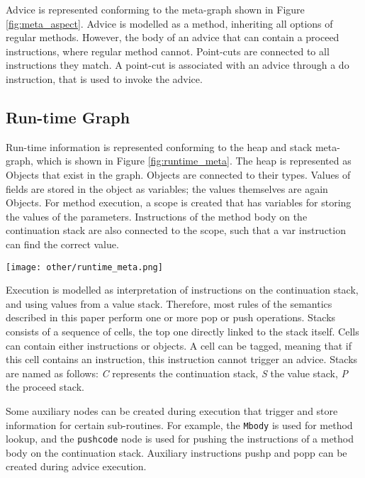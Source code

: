Advice is represented conforming to the meta-graph shown in Figure \ref{fig:meta_aspect}. Advice is modelled as a method, inheriting all options of regular methods. However, the body of an advice that can contain a {\sc proceed} instructions, where regular method cannot. Point-cuts are connected to all instructions they match. A point-cut is associated with an advice through a {\sc do} instruction, that is used to invoke the advice. 

\subsection{Run-time Graph}

Run-time information is represented conforming to the heap and stack
meta-graph, which is shown in Figure \ref{fig:runtime_meta}.  The heap is
represented as Objects that exist in the graph. Objects are connected to their
types. Values of fields are stored in the object as variables; the values
themselves are again Objects.  For method execution, a scope is created that
has variables for storing the values of the parameters. Instructions of the
method body on the continuation stack are also connected to the scope, such
that a {\sc var} instruction can find the correct value.

\begin{figure*}
	\begin{center}
		\texttt{[image: other/runtime\_meta.png]}
	\end{center}
		\caption{Meta-graph of run-time information.}
	\label{fig:runtime_meta}
\end{figure*}

Execution is modelled as interpretation of instructions on the continuation
stack, and using values from a value stack. Therefore, most rules of the
semantics described in this paper perform one or more pop or push operations.
Stacks consists of a sequence of cells, the top one directly linked to the
stack itself. Cells can contain either instructions or objects. A cell can be
tagged, meaning that if this cell contains an instruction, this instruction
cannot trigger an advice. Stacks are named as follows: \emph{C} represents the
continuation stack, \emph{S} the value stack, \emph{P} the proceed stack.

Some auxiliary nodes can be created during execution that trigger and store
information for certain sub-routines. For example, the {\tt Mbody} is used for
method lookup, and the {\tt pushcode} node is used for pushing the instructions
of a method body on the continuation stack. Auxiliary instructions {\sc pushp}
and {\sc popp} can be created during advice execution.

